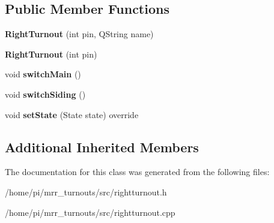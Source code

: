 \subsection*{Public Member Functions}
\begin{DoxyCompactItemize}
\item 
\mbox{\label{classRightTurnout_a8c48f203ce0d26584c5c7cb304bb9c3b}} 
{\bfseries Right\+Turnout} (int pin, Q\+String name)
\item 
\mbox{\label{classRightTurnout_a85d6bae3aebabe8df0179e44ea42ee6b}} 
{\bfseries Right\+Turnout} (int pin)
\item 
\mbox{\label{classRightTurnout_a3240a6ed71c81faf116c05d0a45e5501}} 
void {\bfseries switch\+Main} ()
\item 
\mbox{\label{classRightTurnout_a7e6fed6cad06da57209faf76035922e0}} 
void {\bfseries switch\+Siding} ()
\item 
\mbox{\label{classRightTurnout_aad0a448c625a910706f4aa459b560127}} 
void {\bfseries set\+State} (State state) override
\end{DoxyCompactItemize}
\subsection*{Additional Inherited Members}


The documentation for this class was generated from the following files\+:\begin{DoxyCompactItemize}
\item 
/home/pi/mrr\+\_\+turnouts/src/rightturnout.\+h\item 
/home/pi/mrr\+\_\+turnouts/src/rightturnout.\+cpp\end{DoxyCompactItemize}
